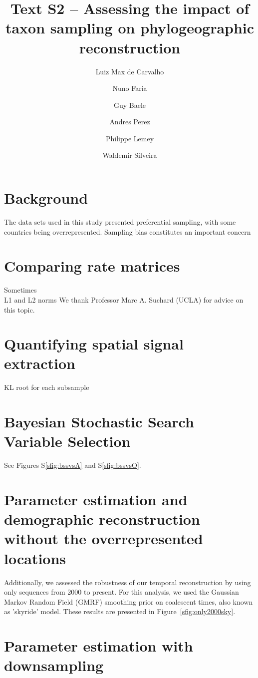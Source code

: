 \documentclass[a4paper,10pt]{article}
\title{Text S2 -- Assessing the impact of taxon sampling on phylogeographic reconstruction} %
\author{
Luiz Max de Carvalho \\
\and Nuno Faria \\
\and Guy Baele\\
\and Andres Perez \\
\and Philippe Lemey \\
\and Waldemir Silveira 
}
\date{}
\begin{document}
\maketitle

\section{Background}
The data sets used in this study presented preferential sampling, with some countries being overrepresented.
Sampling bias constitutes an important concern \cite{Faria2012,Lemey2013,polar}
\section{Comparing rate matrices}
Sometimes \\
L1 and L2 norms
We thank Professor Marc A. Suchard (UCLA) for advice on this topic.\\
\section{Quantifying spatial signal extraction}
KL root for each subsample \cite{KL}
\section{Bayesian Stochastic Search Variable Selection}
See Figures S\ref{sfig:bssvsA} and S\ref{sfig:bssvsO}. 
\section{Parameter estimation and demographic reconstruction without the overrepresented locations}
Additionally, we assessed the robustness of our temporal reconstruction by using only sequences from 2000 to present.
For this analysis, we used the Gaussian Markov Random Field (GMRF) smoothing prior on coalescent times, also known as 'skyride' model.
These results are presented in Figure~\ref{sfig:only2000sky}.
\section{Parameter estimation with downsampling}
\end{document}
